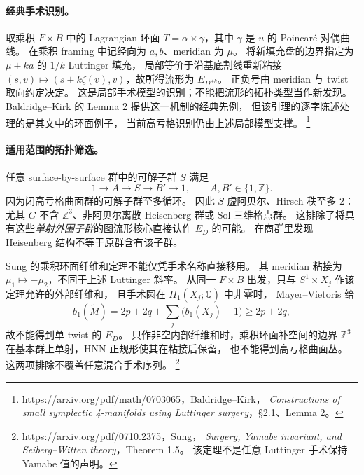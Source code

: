 \documentclass[UTF8,fontset=fandol,zihao=-4,oneside,openany]{ctexbook}
\theoremstyle{cjkplain}
\numberwithin{equation}{chapter}
\begin{document}
\paragraph{经典手术识别。}
取乘积 \(F\times B\) 中的 Lagrangian 环面
\(T=\alpha\times\gamma\)，其中 \(\gamma\) 是 \(u\) 的 Poincar\'e 对偶曲线。
在乘积 framing 中记经向为 \(a,b\)、meridian 为 \(\mu\)。
将新填充盘的边界指定为 \(\mu+ka\) 的 \(1/k\) Luttinger 填充，
局部等价于沿基底割线重新粘接
\((s,v)\mapsto(s+k\zeta(v),v)\)，故所得流形为 \(E_{D^{\pm k}}\)。
正负号由 meridian 与 twist 取向约定决定。
这是局部手术模型的识别；不能把流形的拓扑类型当作新发现。
Baldridge--Kirk 的 Lemma 2 提供这一机制的经典先例，
但该引理的逐字陈述处理的是其文中的环面例子，
当前高亏格识别仍由上述局部模型支撑。%
\footnote{\url{https://arxiv.org/pdf/math/0703065}，Baldridge--Kirk，
\emph{Constructions of small symplectic 4-manifolds using Luttinger surgery}，§2.1、Lemma 2。}

\paragraph{适用范围的拓扑筛选。}
任意 surface-by-surface 群中的可解子群 \(S\) 满足
\[
 1\longrightarrow A\longrightarrow S\longrightarrow B'
 \longrightarrow1,\qquad A,B'\in\{1,\mathbb Z\}.
\]
因为闭高亏格曲面群的可解子群至多循环。
因此 \(S\) 虚阿贝尔、Hirsch 秩至多 \(2\)：
尤其 \(G\) 不含 \(\mathbb Z^3\)、非阿贝尔离散 Heisenberg 群或 Sol 三维格点群。
这排除了将具有这些\emph{单射外围子群}的图流形核心直接认作 \(E_D\) 的可能。
在商群里发现 Heisenberg 结构不等于原群含有该子群。

Sung 的乘积环面纤维和定理不能仅凭手术名称直接移用。
其 meridian 粘接为 \(\mu_1\mapsto-\mu_2\)，不同于上述 Luttinger 斜率。
从同一 \(F\times B\) 出发，只与 \(S^1\times X_j\) 作该定理允许的外部纤维和，
且手术圆在 \(H_1(X_j;\mathbb Q)\) 中非零时，
Mayer--Vietoris 给
\[
 b_1(\widetilde M)
 =2p+2q+\sum_j\bigl(b_1(X_j)-1\bigr)\ge2p+2q,
\]
故不能得到单 twist 的 \(E_D\)。
只作非空内部纤维和时，乘积环面补空间的边界
\(\mathbb Z^3\) 在基本群上单射，HNN 正规形使其在粘接后保留，
也不能得到高亏格曲面丛。
这两项排除不覆盖任意混合手术序列。%
\footnote{\url{https://arxiv.org/pdf/0710.2375}，Sung，
\emph{Surgery, Yamabe invariant, and Seiberg--Witten theory}，Theorem 1.5。
该定理不是任意 Luttinger 手术保持 Yamabe 值的声明。}
\end{document}
